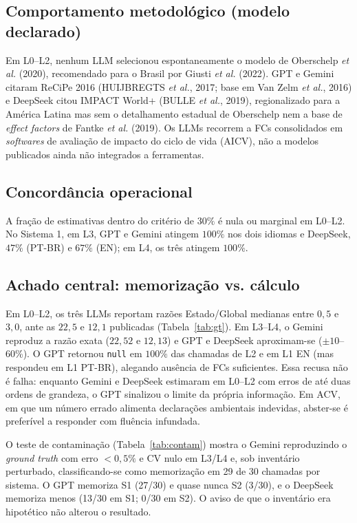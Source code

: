 \documentclass[12pt,a4paper]{article}
\begin{document}
\subsection{Comportamento metodológico (modelo declarado)}

Em L0--L2, nenhum LLM selecionou espontaneamente o modelo de Oberschelp \emph{et al.} (2020), recomendado para o Brasil por Giusti \emph{et al.} (2022). GPT e Gemini citaram ReCiPe 2016 (HUIJBREGTS \emph{et al.}, 2017; base em Van Zelm \emph{et al.}, 2016) e DeepSeek citou IMPACT World+ (BULLE \emph{et al.}, 2019), regionalizado para a América Latina mas sem o detalhamento estadual de Oberschelp nem a base de \emph{effect factors} de Fantke \emph{et al.} (2019). Os LLMs recorrem a FCs consolidados em \emph{softwares} de avaliação de impacto do ciclo de vida (AICV), não a modelos publicados ainda não integrados a ferramentas.

\subsection{Concordância operacional}

A fração de estimativas dentro do critério de $30\%$ é nula ou marginal em L0--L2. No Sistema 1, em L3, GPT e Gemini atingem $100\%$ nos dois idiomas e DeepSeek, $47\%$ (PT-BR) e $67\%$ (EN); em L4, os três atingem $100\%$.

\subsection{Achado central: memorização vs. cálculo}

Em L0--L2, os três LLMs reportam razões Estado/Global medianas entre $0{,}5$ e $3{,}0$, ante as $22{,}5$ e $12{,}1$ publicadas (Tabela~\ref{tab:gt}). Em L3--L4, o Gemini reproduz a razão exata ($22{,}52$ e $12{,}13$) e GPT e DeepSeek aproximam-se ($\pm 10$--60\%). O GPT retornou \texttt{null} em $100\%$ das chamadas de L2 e em L1 EN (mas respondeu em L1 PT-BR), alegando ausência de FCs suficientes. Essa recusa não é falha: enquanto Gemini e DeepSeek estimaram em L0--L2 com erros de até duas ordens de grandeza, o GPT sinalizou o limite da própria informação. Em ACV, em que um número errado alimenta declarações ambientais indevidas, abster-se é preferível a responder com fluência infundada.

O teste de contaminação (Tabela~\ref{tab:contam}) mostra o Gemini reproduzindo o \emph{ground truth} com erro $<0{,}5\%$ e CV nulo em L3/L4 e, sob inventário perturbado, classificando-se como memorização em 29 de 30 chamadas por sistema. O GPT memoriza S1 (27/30) e quase nunca S2 (3/30), e o DeepSeek memoriza menos (13/30 em S1; 0/30 em S2). O aviso de que o inventário era hipotético não alterou o resultado.
\end{document}

